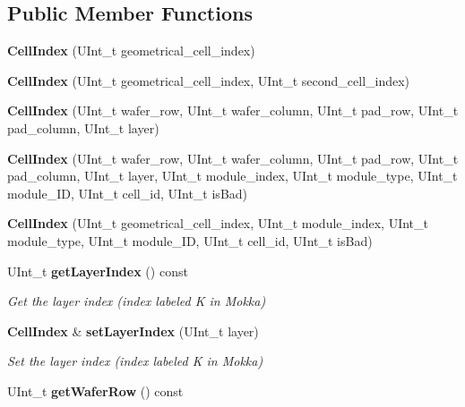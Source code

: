 \subsection*{Public Member Functions}
\begin{DoxyCompactItemize}
\item 
{\bfseries Cell\-Index} (U\-Int\-\_\-t geometrical\-\_\-cell\-\_\-index)\label{classCALICE_1_1CellIndex_a4cf7ff45b88a4e2b1062ae7caaa58806}

\item 
{\bfseries Cell\-Index} (U\-Int\-\_\-t geometrical\-\_\-cell\-\_\-index, U\-Int\-\_\-t second\-\_\-cell\-\_\-index)\label{classCALICE_1_1CellIndex_aba275ac1e16f6e6e08ff9b4e4dd61f17}

\item 
{\bfseries Cell\-Index} (U\-Int\-\_\-t wafer\-\_\-row, U\-Int\-\_\-t wafer\-\_\-column, U\-Int\-\_\-t pad\-\_\-row, U\-Int\-\_\-t pad\-\_\-column, U\-Int\-\_\-t layer)\label{classCALICE_1_1CellIndex_a5ab1c3185be6a529aaf2b4476945ac94}

\item 
{\bfseries Cell\-Index} (U\-Int\-\_\-t wafer\-\_\-row, U\-Int\-\_\-t wafer\-\_\-column, U\-Int\-\_\-t pad\-\_\-row, U\-Int\-\_\-t pad\-\_\-column, U\-Int\-\_\-t layer, U\-Int\-\_\-t module\-\_\-index, U\-Int\-\_\-t module\-\_\-type, U\-Int\-\_\-t module\-\_\-\-I\-D, U\-Int\-\_\-t cell\-\_\-id, U\-Int\-\_\-t is\-Bad)\label{classCALICE_1_1CellIndex_a09201c4195f548a1ecbc740ab5178724}

\item 
{\bfseries Cell\-Index} (U\-Int\-\_\-t geometrical\-\_\-cell\-\_\-index, U\-Int\-\_\-t module\-\_\-index, U\-Int\-\_\-t module\-\_\-type, U\-Int\-\_\-t module\-\_\-\-I\-D, U\-Int\-\_\-t cell\-\_\-id, U\-Int\-\_\-t is\-Bad)\label{classCALICE_1_1CellIndex_a5c849e4daa21098f71c02773466bc2f0}

\item 
U\-Int\-\_\-t {\bf get\-Layer\-Index} () const \label{classCALICE_1_1CellIndex_a0467195bc639bda8edba4a9c96e7c0c3}

\begin{DoxyCompactList}\small\item\em Get the layer index (index labeled K in Mokka) \end{DoxyCompactList}\item 
{\bf Cell\-Index} \& {\bf set\-Layer\-Index} (U\-Int\-\_\-t layer)\label{classCALICE_1_1CellIndex_a1138c5745d65ec60aa71938eb87bc842}

\begin{DoxyCompactList}\small\item\em Set the layer index (index labeled K in Mokka) \end{DoxyCompactList}\item 
U\-Int\-\_\-t {\bf get\-Wafer\-Row} () const \label{classCALICE_1_1CellIndex_a760bda3a8354e9d93d9332220aa7c97d}


\end{DoxyCompactItemize}
